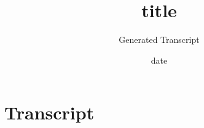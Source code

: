 \documentclass{amsart}
\title{{ title }}
\date{{ date }}
\author{Generated Transcript}
\theoremstyle{definition}
\begin{document}
\large
\maketitle
\section*{Transcript}
\end{document}
